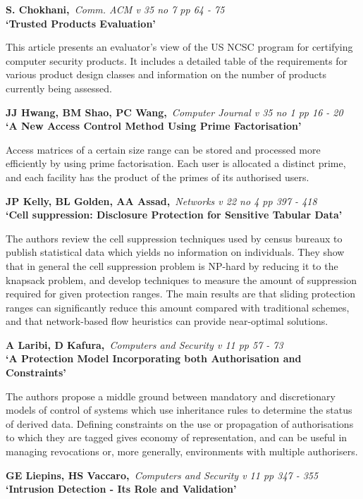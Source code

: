 {\bf \noindent S. Chokhani,}{\em ~Comm. ACM v 35 no 7 pp 64 - 75\\}
{\bf `Trusted Products Evaluation'}

This article presents an evaluator's view of the US NCSC program for
certifying computer security products. It includes a detailed table of
the requirements for various product design classes and information
on the number of products currently being assessed.

{\bf \noindent JJ Hwang, BM Shao, PC Wang,}{\em ~Computer Journal v 35 no 1
pp 16 - 20\\}
{\bf `A New Access Control Method Using Prime Factorisation'}

Access matrices of a certain size range can be stored and processed more 
efficiently by using prime factorisation. Each user is allocated a distinct 
prime, and each facility has the product of the primes of its authorised 
users.

{\bf \noindent JP Kelly, BL Golden, AA Assad,}{\em ~Networks v 22 no 4 pp
397 - 418\\}
{\bf `Cell suppression: Disclosure Protection for Sensitive Tabular Data'}

The authors review the cell suppression techniques used by census bureaux
to publish statistical data which yields no information on individuals.
They show that in general the cell suppression problem is NP-hard by 
reducing it to the knapsack problem, and develop techniques to measure the
amount of suppression required for given protection ranges. The main results
are that sliding protection ranges can significantly reduce this amount
compared with traditional schemes, and that network-based flow heuristics can
provide near-optimal solutions.

{\bf \noindent A Laribi, D Kafura,}{\em ~Computers and Security v 11 pp
57 - 73\\}
{\bf `A Protection Model Incorporating both Authorisation and Constraints'}

The authors propose a middle ground between mandatory and discretionary
models of control of systems which use inheritance rules to determine the
status of derived data. Defining constraints on the use or propagation of
authorisations to which they are tagged gives economy of representation, 
and can be useful in managing revocations or, more generally, environments 
with multiple authorisers.

{\bf \noindent GE Liepins, HS Vaccaro,}{\em ~Computers and Security v 11
pp 347 - 355\\}
{\bf `Intrusion Detection - Its Role and Validation'}

